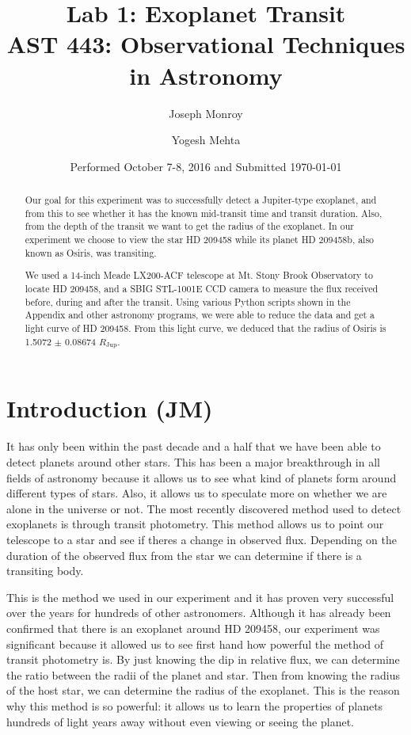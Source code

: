 \documentclass{aastex61}
\begin{document}
\title{Lab 1: Exoplanet Transit \\ AST 443: Observational Techniques in Astronomy}

\date{Performed October 7-8, 2016 and Submitted \today}

\author{Joseph Monroy}

\author{Yogesh Mehta}


\begin{abstract}
Our goal for this experiment was to successfully detect a Jupiter-type exoplanet, and from this to see whether it has the known mid-transit time and transit duration. Also, from the depth of the transit we want to get the radius of the exoplanet. In our experiment we choose to view the star HD 209458 while its planet HD 209458b, also known as Osiris, was transiting. 

We used a 14-inch Meade LX200-ACF telescope at Mt. Stony Brook Observatory to locate HD 209458, and a SBIG STL-1001E CCD camera to measure the flux received before, during and after the transit. Using various Python scripts shown in the Appendix and other astronomy programs, we were able to reduce the data and get a light curve of HD 209458. From this light curve, we deduced that the radius of Osiris is 1.5072 $\pm$ 0.08674 $R_{\text{Jup}}$. 
\end{abstract}

\section{Introduction (JM)} \label{sec:intro}
It has only been within the past decade and a half that we have been able to detect planets around other stars. This has been a major breakthrough in all fields of astronomy because it allows us to see what kind of planets form around different types of stars. Also, it allows us to speculate more on whether we are alone in the universe or not. The most recently discovered method used to detect exoplanets is through transit photometry. This method allows us to point our telescope to a star and see if theres a change in observed flux. Depending on the duration of the observed flux from the star we can determine if there is a transiting body. 

This is the method we used in our experiment and it has proven very successful over the years for hundreds of other astronomers. Although it has already been confirmed that there is an exoplanet around HD 209458, our experiment was significant because it allowed us to see first hand how powerful the method of transit photometry is. By just knowing the dip in relative flux, we can determine the ratio between the radii of the planet and star. Then from knowing the radius of the host star, we can determine the radius of the exoplanet. This is the reason why this method is so powerful: it allows us to learn the properties of planets hundreds of light years away without even viewing or seeing the planet. 
\end{document}
